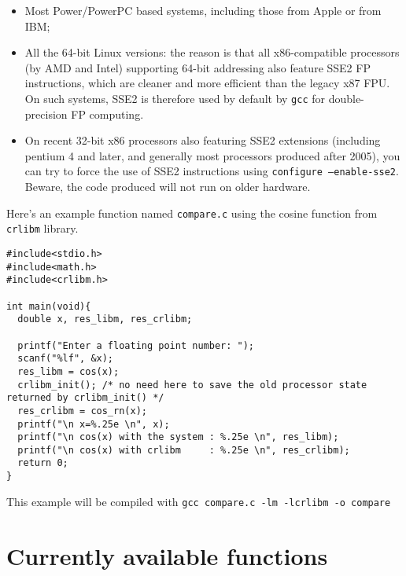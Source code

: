 \begin{itemize}
\item Most Power/PowerPC based systems, including those from Apple or from IBM;
\item All the 64-bit Linux versions: the reason is that all
  x86-compatible processors (by AMD and Intel) supporting 64-bit
  addressing also feature SSE2 FP instructions, which are cleaner and
  more efficient than the legacy x87 FPU. On such systems, SSE2 is
  therefore used by default by \texttt{gcc} for double-precision FP
  computing.
\item On recent 32-bit x86 processors also featuring SSE2 extensions
  (including pentium 4 and later, and generally most processors
  produced after 2005), you can try to force the use of SSE2
  instructions using \texttt{configure --enable-sse2}. Beware, the
  code produced will not run on older hardware.
\end{itemize}

Here's an example function named \texttt{compare.c} using the cosine
function from \texttt{crlibm} library.

\begin{lstlisting}[label={chap0:lst:prog_example},caption={compare.c},firstnumber=1]
#include<stdio.h>
#include<math.h>
#include<crlibm.h>

int main(void){
  double x, res_libm, res_crlibm;

  printf("Enter a floating point number: ");
  scanf("%lf", &x);
  res_libm = cos(x);
  crlibm_init(); /* no need here to save the old processor state returned by crlibm_init() */ 
  res_crlibm = cos_rn(x);
  printf("\n x=%.25e \n", x);
  printf("\n cos(x) with the system : %.25e \n", res_libm);
  printf("\n cos(x) with crlibm     : %.25e \n", res_crlibm);
  return 0;
}
\end{lstlisting}

This example will be compiled with \texttt{gcc compare.c -lm -lcrlibm -o compare}


\section{Currently available functions}


